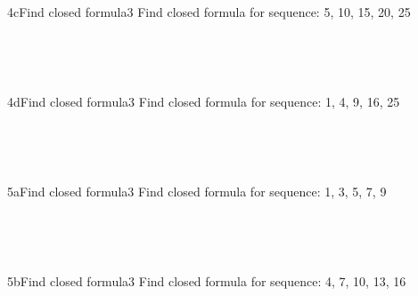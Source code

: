 \documentclass[a4paper,12pt]{book}
\begin{document}
    ~\\
    
    \hrulefill
    
    ~\\
    \begin{answersheetquestion}{4c}{Find closed formula}{3}
        Find closed formula for sequence: 5, 10, 15, 20, 25
        \iftoggle{answerkey}{ \begin{answer} $a_{n} = 5n$ \end{answer} }{ { ~\\ \raisebox{0pt}[2cm][0pt]{  } } }
    \end{answersheetquestion}

    ~\\
    
    \hrulefill
    
    ~\\
    \begin{answersheetquestion}{4d}{Find closed formula}{3}
        Find closed formula for sequence: 1, 4, 9, 16, 25
        \iftoggle{answerkey}{ \begin{answer} $a_{n} = n^{2}$ \end{answer} }{ { ~\\ \raisebox{0pt}[2cm][0pt]{  } } }
    \end{answersheetquestion}

    ~\\
    
    \hrulefill
    
    ~\\
    \begin{answersheetquestion}{5a}{Find closed formula}{3}
        Find closed formula for sequence: 1, 3, 5, 7, 9
        \iftoggle{answerkey}{ \begin{answer} $a_{n} = 2n-1$ \end{answer} }{ { ~\\ \raisebox{0pt}[2cm][0pt]{  } } }
    \end{answersheetquestion}
    
    ~\\
    
    \hrulefill
    
    ~\\
    \begin{answersheetquestion}{5b}{Find closed formula}{3}
        Find closed formula for sequence: 4, 7, 10, 13, 16
        \iftoggle{answerkey}{ \begin{answer} $a_{n} = 3n+1$ \end{answer} }{ { ~\\ \raisebox{0pt}[2cm][0pt]{  } } }
    \end{answersheetquestion}
    
\end{document}
